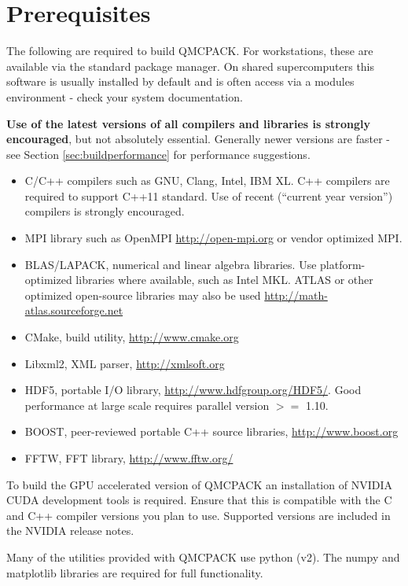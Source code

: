 \section{Prerequisites}
\label{sec:prerequisites}
The following are required to build QMCPACK. For workstations, these are available via the standard
package manager. On shared supercomputers this software is usually
installed by default and is often
access via a modules environment - check your system
documentation.

\textbf{Use of the latest versions of all compilers and libraries is
strongly encouraged}, but not absolutely essential. Generally newer versions are faster - see
Section \ref{sec:buildperformance} for performance suggestions.

\begin{itemize}
\item C/C++ compilers such as GNU, Clang, Intel, IBM XL. C++ compilers
  are required to support C++11 standard. Use of recent (``current
  year version'') compilers is strongly encouraged.
\item MPI library such as OpenMPI \url{http://open-mpi.org} or vendor
  optimized MPI.
\item BLAS/LAPACK, numerical and linear algebra libraries. Use
  platform-optimized libraries where available, such as Intel MKL.
  ATLAS or other optimized open-source libraries may also be used
  \url{http://math-atlas.sourceforge.net}
\item CMake, build utility, \url{http://www.cmake.org}
\item Libxml2, XML parser, \url{http://xmlsoft.org}
\item HDF5, portable I/O library, \url{http://www.hdfgroup.org/HDF5/}. Good performance at large scale requires parallel version $>=$ 1.10.
\item BOOST, peer-reviewed portable C++ source libraries, \url{http://www.boost.org}
\item FFTW, FFT library, \url{http://www.fftw.org/}
\end{itemize}

To build the GPU accelerated version of QMCPACK an installation of
NVIDIA CUDA development tools is required. Ensure that this is
compatible with the C and C++ compiler versions you plan to
use. Supported versions are included in the NVIDIA release notes.

Many of the utilities provided with QMCPACK use python (v2). The numpy
and matplotlib libraries are required for full functionality.

